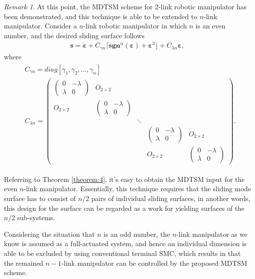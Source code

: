 \documentclass[3p]{elsarticle}
\theoremstyle{plain}
\theoremstyle{remark}
\newtheorem{myrem}{Remark}
\begin{document}
\begin{myrem}
At this point, the MDTSM scheme for $2$-link robotic manipulator has been demonstrated, and this technique is able to be extended to $n$-link manipulator. Consider a $n$-link robotic manipulator in which $n$ is an even number, and the desired sliding surface follows
\begin{align}
\bm s = \dot{\bm \varepsilon}+C_{\gamma n}\lceil\bm{sgn}^\alpha(\bm \varepsilon)+\bm\varepsilon^3\rfloor+C_{\lambda n}{\bm\varepsilon},
\end{align}
where
\begin{align}
\begin{split}
&C_{\gamma n}=diag[\gamma_1,\gamma_2,\ldots,\gamma_n]\\
&C_{\lambda n}=
\begin{pmatrix}
\begin{pmatrix}
0 &-\lambda\\ \lambda &0
\end{pmatrix} &O_{2\times 2} & & &\\
O_{2\times 2} &\begin{pmatrix}
0 &-\lambda\\ \lambda &0
\end{pmatrix} & & &\\
& &\ddots & &\\
& & &\begin{pmatrix}
0 &-\lambda\\ \lambda &0
\end{pmatrix} &O_{2\times 2}\\
& & &O_{2\times 2} &\begin{pmatrix}
0 &-\lambda\\ \lambda &0
\end{pmatrix}
\end{pmatrix}.
\end{split}
\end{align}\par
Referring to Theorem \ref{theorem:4}, it's easy to obtain the MDTSM input for the even $n$-link manipulator. Essentially, this technique requires that the sliding mode surface has to consist of $n/2$ pairs of individual sliding surfaces, in another words, this design for the surface can be regarded as a work for yielding surfaces of the $n/2$ sub-systems.\par
Considering the situation that $n$ is an odd number, the $n$-link manipulator as we know is assumed as a full-actuated system, and hence an individual dimension is able to be excluded by using conventional terminal SMC, which results in that the remained $n-1$-link manipulator can be controlled by the proposed MDTSM scheme.
\end{myrem}
\end{document}
